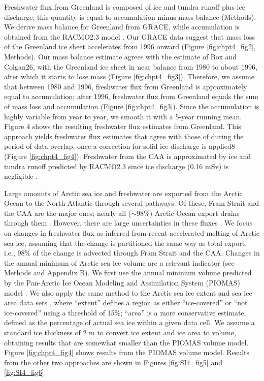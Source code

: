 Freshwater flux from Greenland is composed of ice and tundra runoff plus ice discharge; this quantity is equal to accumulation minus mass balance (Methods).  We derive mass balance for Greenland from GRACE, while accumulation is obtained from the RACMO2.3 model \cite{ettema2009,noel2015}.  Our GRACE data suggest that mass loss of the Greenland ice sheet accelerates from 1996 onward (Figure \ref{fig:chpt4_fig2},  Methods).  Our mass balance estimate agrees with the estimate of Box and Colgan26, with the Greenland ice sheet in near balance from 1980 to about 1996, after which it starts to lose mass (Figure \ref{fig:chpt4_fig3}).  Therefore, we assume that between 1980 and 1996, freshwater flux from Greenland is approximately equal to accumulation;  after 1996, freshwater flux from Greenland equals the sum of mass loss and accumulation (Figure \ref{fig:chpt4_fig3}).  Since the accumulation is highly variable from year to year, we smooth it with a 5-year running mean.  Figure 4 shows the resulting freshwater flux estimates from Greenland.  This approach yields freshwater flux estimates that agree  with those of \citet{bamber2012} during the period of data overlap, once a correction for solid ice discharge is applied8 (Figure \ref{fig:chpt4_fig4}).  Freshwater from the CAA is approximated by ice and tundra runoff predicted by RACMO2.3 since ice discharge (0.16 mSv) is negligible \cite[]{gardner2011}.  

Large amounts of Arctic sea ice and freshwater are exported from the Arctic Ocean to the North Atlantic through several pathways.  Of these, Fram Strait and the CAA are the major ones; nearly all ($\sim$98\%) Arctic Ocean export drains through them \cite[]{haine2015}. However, there are large uncertainties in these fluxes \cite[]{haine2015}.  We focus on changes in freshwater flux as inferred from recent accelerated melting of Arctic sea ice, assuming that the change is partitioned the same way as total export, i.e., 98\% of the change is advected through Fram Strait and the CAA.  Changes in the annual minimum of Arctic sea ice volume are a relevant indicator (see Methods and Appendix B).  We first use the annual minimum volume predicted by the Pan-Arctic Ice Ocean Modeling and Assimilation System (PIOMAS) model \cite[]{zhang2003}.   We also apply the same method to the Arctic sea ice extent and sea ice area data sets \cite[]{fetterer2002}, where “extent” defines a region as either “ice-covered” or “not ice-covered” using a threshold of 15\%; “area” is a more conservative estimate, defined as the percentage of actual sea ice within a given data cell.  We assume a standard ice thickness of 2 m \cite[]{laxon2003} to convert ice extent and ice area to volume, obtaining results that are somewhat smaller than the PIOMAS volume model.  Figure \ref{fig:chpt4_fig4} shows results from the PIOMAS volume model.  Results from the other two approaches are shown in Figures \ref{fig:SI4_fig5} and \ref{fig:SI4_fig6}.  

